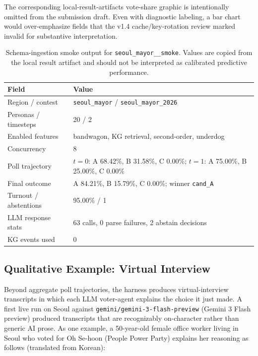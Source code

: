\documentclass[11pt]{article}
\begin{document}
The corresponding local-result-artifacts vote-share graphic is intentionally omitted from the submission draft. Even with diagnostic labeling, a bar chart would over-emphasize fields that the v1.4 cache/key-rotation review marked invalid for substantive interpretation.

\begin{table}[h]
\centering
\caption{Schema-ingestion smoke output for \texttt{seoul\_mayor\_\_smoke}. Values are copied from the local result artifact and should not be interpreted as calibrated predictive performance.}
\label{tab:smoke-result}
\small
\begin{tabularx}{\textwidth}{L{0.24\textwidth}Y}
\toprule
Field & Value \\
\midrule
Region / contest & \texttt{seoul\_mayor} / \texttt{seoul\_mayor\_2026} \\
Personas / timesteps & 20 / 2 \\
Enabled features & bandwagon, KG retrieval, second-order, underdog \\
Concurrency & 8 \\
Poll trajectory & $t=0$: A 68.42\%, B 31.58\%, C 0.00\%; $t=1$: A 75.00\%, B 25.00\%, C 0.00\% \\
Final outcome & A 84.21\%, B 15.79\%, C 0.00\%; winner \texttt{cand\_A} \\
Turnout / abstentions & 95.00\% / 1 \\
LLM response stats & 63 calls, 0 parse failures, 2 abstain decisions \\
KG events used & 0 \\
\bottomrule
\end{tabularx}
\end{table}

\subsection{Qualitative Example: Virtual Interview}
\label{sec:qual-example}

Beyond aggregate poll trajectories, the harness produces virtual-interview transcripts in which each LLM voter-agent explains the choice it just made. A first live run on Seoul against \texttt{gemini/gemini-3-flash-preview} (Gemini 3 Flash preview) produced transcripts that are recognizably on-character rather than generic AI prose. As one example, a 50-year-old female office worker living in Seoul who voted for Oh Se-hoon (People Power Party) explains her reasoning as follows (translated from Korean):
\end{document}
